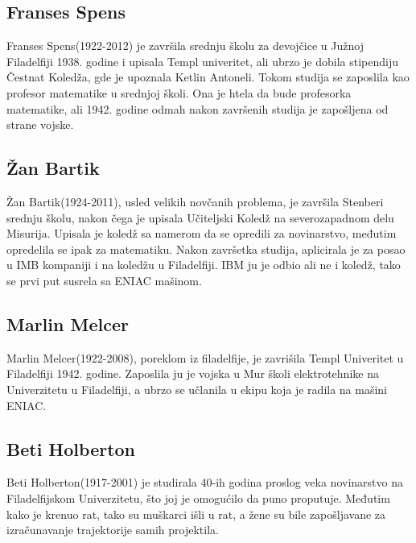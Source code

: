 \documentclass[a4paper,12pt]{article}
\begin{document}
\subsection{Franses Spens}
\begin{flushleft}

Franses Spens(1922-2012) je završila srednju školu za devojčice u Južnoj Filadelfiji 1938. godine i upisala Templ univeritet, ali ubrzo je dobila stipendiju Čestnat Koledža, gde je upoznala Ketlin Antoneli. Tokom studija se zaposlila kao profesor matematike u srednjoj školi. Ona je htela da bude profesorka matematike, ali 1942. godine odmah nakon završenih studija je zapošljena od strane vojske.

\end{flushleft}

\subsection{Žan Bartik}
\begin{flushleft}

Žan Bartik(1924-2011), usled velikih novčanih problema, je završila Stenberi srednju školu, nakon čega je upisala Učiteljski Koledž na severozapadnom delu Misurija. Upisala je koledž sa namerom da se opredili za novinarstvo, međutim opredelila se ipak za matematiku. Nakon završetka studija, aplicirala je za posao u IMB kompaniji i na koledžu u Filadelfiji. IBM ju je odbio ali ne i koledž, tako se prvi put susrela sa ENIAC mašinom. 

\end{flushleft}

\subsection{Marlin Melcer}
\begin{flushleft}

Marlin Melcer(1922-2008), poreklom iz filadelfije, je zavrišila Templ Univeritet u Filadelfiji 1942. godine. Zaposlila ju je vojska u Mur školi elektrotehnike na Univerzitetu u Filadelfiji, a ubrzo se učlanila u ekipu koja je radila na mašini ENIAC. 

\end{flushleft}

\subsection{Beti Holberton}
\begin{flushleft}

Beti Holberton(1917-2001) je studirala 40-ih godina proslog veka novinarstvo na Filadelfijskom Univerzitetu, što joj je omogućilo da puno proputuje. Međutim kako je krenuo rat, tako su muškarci išli u rat, a žene su bile zapošljavane za izračunavanje trajektorije samih projektila.

\end{flushleft}
\end{document}
